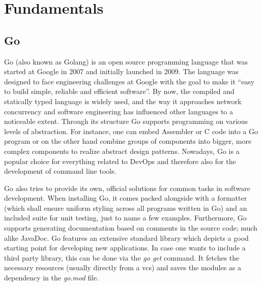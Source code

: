 \chapter{Fundamentals}
\section{Go}
Go (also known as Golang) is an open source programming language that was started at Google in 2007 and initially launched in 2009.
The language was designed to face engineering challenges at Google with the goal to make it \enquote{easy to build simple, reliable and efficient software}. \cite{pike.2020, golang.github}
By now, the compiled and statically typed language \cite{chris.2021} is widely used, and the way it approaches network concurrency and software engineering has influenced other languages to a noticeable extent. \cite{pike.2020}
Through its structure Go supports programming on various levels of abstraction.
For instance, one can embed Assembler or C code into a Go program or on the other hand combine groups of components into bigger, more complex components to realize abstract design patterns. \cite{Maurer2021}
Nowadays, Go is a popular choice for everything related to DevOps and therefore also for the development of command line tools. \cite{mike.2020}

Go also tries to provide its own, official solutions for common tasks in software development.
When installing Go, it comes packed alongside with a formatter (which shall ensure uniform styling across all programs written in Go) and an included suite for unit testing, just to name a few examples.
Furthermore, Go supports generating documentation based on comments in the source code; much alike JavaDoc.
Go features an extensive standard library which depicts a good starting point for developing new applications.
In case one wants to include a third party library, this can be done via the \emph{go get} command.
It fetches the necessary resources (usually directly from a \ac{vcs}) and saves the modules as a dependency in the \emph{go.mod} file. \cite{go.tour, go.docs}



